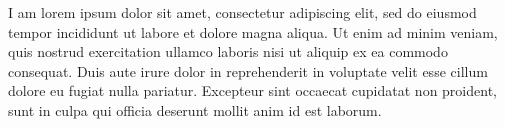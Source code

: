 
\begin{cventries}

\begin{cvparagraph}
  \begin{adjustwidth}{0.4cm}{}
    \begin{flushleft}
      \hspace{10pt} I am lorem ipsum dolor sit amet, consectetur adipiscing elit, sed do eiusmod tempor incididunt ut labore et dolore magna aliqua. Ut enim ad minim veniam, quis nostrud exercitation ullamco laboris nisi ut aliquip ex ea commodo consequat. Duis aute irure dolor in reprehenderit in voluptate velit esse cillum dolore eu fugiat nulla pariatur. Excepteur sint occaecat cupidatat non proident, sunt in culpa qui officia deserunt mollit anim id est laborum.
    \end{flushleft}
  \end{adjustwidth}
\end{cvparagraph}


\end{cventries}
